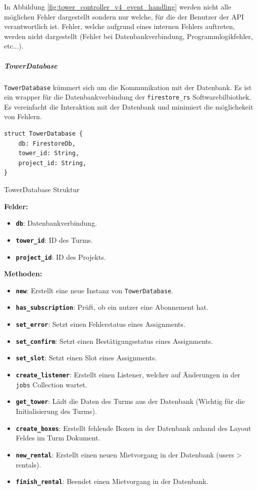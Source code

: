 In Abbildung \ref{fig:tower_controller_v4_event_handling} werden nicht alle möglichen Fehler dargestellt sondern nur welche, für die der Benutzer der \ac{API} verantwortlich ist. Fehler, welche aufgrund eines internen Fehlers auftreten, werden nicht dargestellt (Fehler bei Datenbankverbindung, Programmlogikfehler, etc...).

\clearpage

\subparagraph{TowerDatabase}

\texttt{TowerDatabase} kümmert sich um die Kommunikation mit der Datenbank. Es ist ein \Gls{wrapper} für die Datenbankverbindung der \texttt{firestore\_rs} Softwarebilbiothek.
Es vereinfacht die Interaktion mit der Datenbank und minimiert die möglichekeit von Fehlern.

\begin{listing}[H]
  \begin{verbatim}
struct TowerDatabase {
    db: FirestoreDb,
    tower_id: String,
    project_id: String,
}
  \end{verbatim}
  \caption{TowerDatabase Struktur}
  \label{lst:tower_database_struktur}
\end{listing}

\textbf{Felder:}
\begin{itemize}
  \item \textbf{\texttt{db}}: Datenbankverbindung.
  \item \textbf{\texttt{tower\_id}}: ID des Turms.
  \item \textbf{\texttt{project\_id}}: ID des Projekts.
\end{itemize}

\textbf{Methoden:}
\begin{itemize}
  \item \textbf{\texttt{new}}: Erstellt eine neue Instanz von \texttt{TowerDatabase}.
  \item \textbf{\texttt{has\_subscription}}: Prüft, ob ein nutzer eine Abonnement hat.
  \item \textbf{\texttt{set\_error}}: Setzt einen Fehlerstatus eines Assignments.
  \item \textbf{\texttt{set\_confirm}}: Setzt einen Bestätigungsstatus eines Assignments.
  \item \textbf{\texttt{set\_slot}}: Setzt einen Slot eines Assignments.
  \item \textbf{\texttt{create\_listener}}: Erstellt einen Listener, welcher auf Änderungen in der \texttt{jobs} Collection wartet.
  \item \textbf{\texttt{get\_tower}}: Lädt die Daten des Turms aus der Datenbank (Wichtig für die Initialisierung des Turms).
  \item \textbf{\texttt{create\_boxes}}: Erstellt fehlende Boxen in der Datenbank anhand des Layout Feldes im Turm Dokument.
  \item \textbf{\texttt{new\_rental}}: Erstellt einen neuen Mietvorgang in der Datenbank (users > rentals).
  \item \textbf{\texttt{finish\_rental}}: Beendet einen Mietvorgang in der Datenbank.
\end{itemize}


